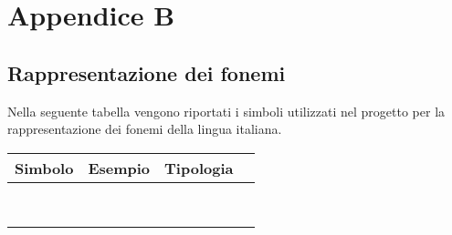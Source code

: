 
\chapter{Appendice B}
\label{app:unit-test}
\section{Rappresentazione dei fonemi}
Nella seguente tabella vengono riportati i simboli utilizzati nel progetto per 
la rappresentazione dei fonemi della lingua italiana.
\begin{center}
        		\bgroup
        		\def\arraystretch{1.8}
        		\begin{longtable}{ | l | p{2cm} | p{4.7cm} | p{2.5cm} |}
        		\hline
        		\textbf{Simbolo} & \textbf{Esempio}
        		& \textbf{Tipologia} \\ \hline
        		 & &  \newline  \\ \hline
        		 &  & \newline  \\ \hline
       			 & &  \newline  \\ \hline
        		 & &  \newline  \\ \hline
         
        		 & & \newline  \\ \hline
        		 & & \newline  \\ \hline
       			 & &  \newline  \\ \hline
        	 	 & & \newline  \\ \hline                 


\end{longtable}
\end{center}
